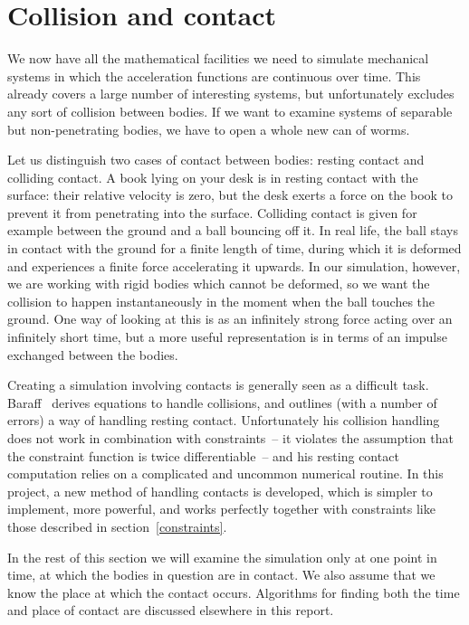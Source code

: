 \section{Collision and contact}

We now have all the mathematical facilities we need to simulate mechanical systems in which
the acceleration functions are continuous over time. This already covers a large number of
interesting systems, but unfortunately excludes any sort of collision between bodies. If we want
to examine systems of separable but non-penetrating bodies, we have to open a whole new can of
worms.

Let us distinguish two cases of contact between bodies: resting contact and colliding contact.
A book lying on your desk is in resting contact with the surface: their relative velocity is zero,
but the desk exerts a force on the book to prevent it from penetrating into the surface.
Colliding contact is given for example between the ground and a ball bouncing off it. In real
life, the ball stays in contact with the ground for a finite length of time, during which it is
deformed and experiences a finite force accelerating it upwards. In our simulation, however, we
are working with rigid bodies which cannot be deformed, so we want the collision to happen
instantaneously in the moment when the ball touches the ground. One way of looking at this is as
an infinitely strong force acting over an infinitely short time, but a more useful representation
is in terms of an impulse exchanged between the bodies.

Creating a simulation involving contacts is generally seen as a difficult task.
Baraff~\cite{BaraffWitkin:97} derives equations to handle collisions, and outlines (with a number
of errors) a way of handling resting contact. Unfortunately his collision handling does not work
in combination with constraints~-- it violates the assumption that the constraint function is
twice differentiable~-- and his resting contact computation relies on a complicated and uncommon
numerical routine. In this project, a new method of handling contacts is developed, which is
simpler to implement, more powerful, and works perfectly together with constraints like those
described in section~\ref{constraints}.

In the rest of this section we will examine the simulation only at one point in time, at which
the bodies in question are in contact. We also assume that we know the place at which the contact
occurs. Algorithms for finding both the time and place of contact are discussed elsewhere in this
report.

